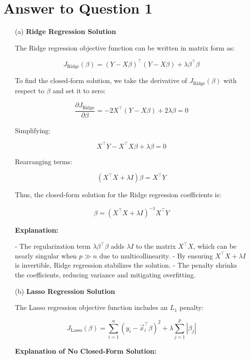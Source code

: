 \documentclass{article}
\begin{document}
\section*{Answer to Question 1}

\begin{enumerate}
    \item[(a)] \textbf{Ridge Regression Solution}
    
    The Ridge regression objective function can be written in matrix form as:
    
    \[
    J_{\text{Ridge}}(\beta) = (Y - X\beta)^\top (Y - X\beta) + \lambda \beta^\top \beta
    \]
    
    To find the closed-form solution, we take the derivative of \( J_{\text{Ridge}}(\beta) \) with respect to \( \beta \) and set it to zero:
    
    \[
    \frac{\partial J_{\text{Ridge}}}{\partial \beta} = -2X^\top(Y - X\beta) + 2\lambda \beta = 0
    \]
    
    Simplifying:
    
    \[
    X^\top Y - X^\top X \beta + \lambda \beta = 0
    \]
    
    Rearranging terms:
    
    \[
    (X^\top X + \lambda I) \beta = X^\top Y
    \]
    
    Thus, the closed-form solution for the Ridge regression coefficients is:
    
    \[
    \beta = (X^\top X + \lambda I)^{-1} X^\top Y
    \]
    
    \textbf{Explanation:}
    
    - The regularization term \( \lambda \beta^\top \beta \) adds \( \lambda I \) to the matrix \( X^\top X \), which can be nearly singular when \( p \gg n \) due to multicollinearity.
    - By ensuring \( X^\top X + \lambda I \) is invertible, Ridge regression stabilizes the solution.
    - The penalty shrinks the coefficients, reducing variance and mitigating overfitting.
    
    \item[(b)] \textbf{Lasso Regression Solution}
    
    The Lasso regression objective function includes an \( L_1 \) penalty:
    
    \[
    J_{\text{Lasso}}(\beta) = \sum_{i=1}^n (y_i - \vec{x}_i^\top \beta)^2 + \lambda \sum_{j=1}^p |\beta_j|
    \]
    
    \textbf{Explanation of No Closed-Form Solution:}
    

\end{enumerate}
\end{document}

